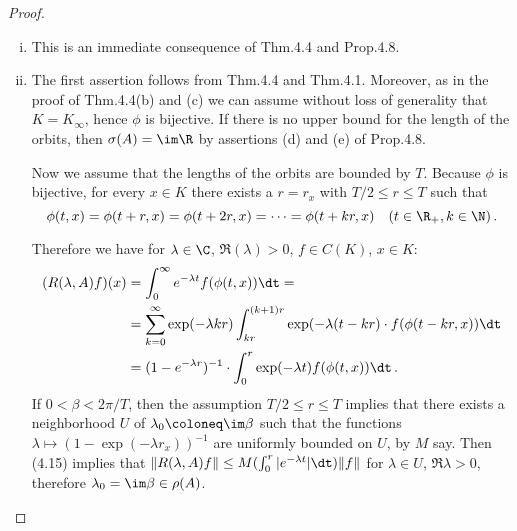 %
%
\begin{proof}
\begin{enumerate}[(i), wide]%
\item 
	This is an immediate consequence of Thm.4.4 and Prop.4.8.
	
\item 
	The first assertion follows from Thm.4.4 and Thm.4.1.
	Moreover, as in the proof of Thm.4.4(b) and (c) we can assume without loss of generality that $K = K_{\infty}$, hence $\phi$ is bijective.
	If there is no upper bound for the length of the orbits, then $\sigma(A) = \im\R$ by assertions (d) and (e) of Prop.4.8.
	
	Now we assume that the lengths of the orbits are bounded by $T$.
	Because $\phi$ is bijective, for every $x \in K$ there exists a $r = r_{x}$ with $T/2 \leq r \leq T$ such that 
	\[
	\phi(t,x) = \phi(t+r,x) = \phi(t+2r,x) = \cdots = \phi(t+kr,x) \quad (t \in \R_{+}, k \in \N)\,.
	\]
	
	Therefore we have for $\lambda \in \C$, $\Re(\lambda) > 0$, $f \in C(K)$, $x \in K$:
	\begin{equation}\label{eq:b3-4.15}
		\begin{aligned}
			(R(\lambda,A)f)(x) &= \int_{0}^{\infty} e^{-\lambda t}f(\phi(t,x)) \dt = \\
			&= \sum_{k=0}^{\infty} \exp(-\lambda kr)\int_{kr}^{(k+1)r} \exp(-\lambda(t-kr)\cdot f(\phi(t-kr,x)) \dt \\
			&= (1 - e^{-\lambda r})^{-1}\cdot\int_{0}^{r} \exp(-\lambda t)f(\phi(t,x)) \dt\,.
		\end{aligned}
	\end{equation}
	If $0 < \beta < 2\pi/T$, then the assumption $T/2 \leq r \leq T$ implies that there exists a neighborhood $U$ of $\lambda_{0} \coloneq \im\beta$ such that the functions $\lambda \mapsto (1 - \exp(-\lambda r_{x}))^{-1}$ are uniformly bounded on $U$, by $M$ say.
	Then (4.15) implies that $\|R(\lambda,A)f\| \leq M(\int_{0}^{r} |e^{-\lambda t}|\dt)\|f\|$ for $\lambda \in U$, $\Re\lambda > 0$, therefore $\lambda_{0} = \im\beta \in \rho(A)$.
\end{enumerate}
\end{proof}
